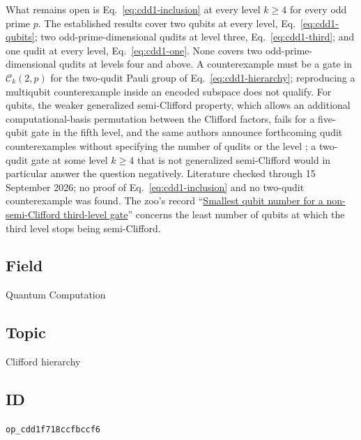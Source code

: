 What remains open is Eq.~\eqref{eq:cdd1-inclusion} at every level $k\geq4$
for every odd prime $p$.  The established results cover two qubits at every
level, Eq.~\eqref{eq:cdd1-qubits}; two odd-prime-dimensional qudits at level
three, Eq.~\eqref{eq:cdd1-third}; and one qudit at every level,
Eq.~\eqref{eq:cdd1-one}.  None covers two odd-prime-dimensional qudits at levels
four and above.  A counterexample must be a gate in $\mathcal{C}_k(2,p)$ for
the two-qudit Pauli group of Eq.~\eqref{eq:cdd1-hierarchy}; reproducing a
multiqubit counterexample inside an encoded subspace does not qualify.  For
qubits, the weaker generalized semi-Clifford property, which allows an
additional computational-basis permutation between the Clifford factors, fails
for a five-qubit gate in the fifth level, and the same authors announce
forthcoming qudit counterexamples without specifying the number of qudits or
the level ; a two-qudit gate at some level
$k\geq4$ that is not generalized semi-Clifford would in particular answer the
question negatively.  Literature checked through 15 September 2026; no proof
of Eq.~\eqref{eq:cdd1-inclusion} and no two-qudit counterexample was found.
The zoo's record
``\href{https://qiqc-op.com/problem/op_5a17b19b8adeb191/}{Smallest qubit number for a non-semi-Clifford third-level gate}''
concerns the least number of qubits at which the third level stops being
semi-Clifford.

\subsection*{Field}

Quantum Computation

\subsection*{Topic}

Clifford hierarchy

\subsection*{ID}

\texttt{op\_cdd1f718ccfbccf6}
